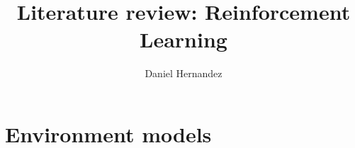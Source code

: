 \documentclass{article}
\title{\textbf{Literature review: Reinforcement Learning}}
\author{Daniel Hernandez}
\date{ }
\begin{document}
\maketitle



% 
% 
%
%
%    
%
%    
\section{Environment models}\label{section:environment-models}

    
%
%
%
% 
%
%  
%
%
%
%
%



\end{document}
